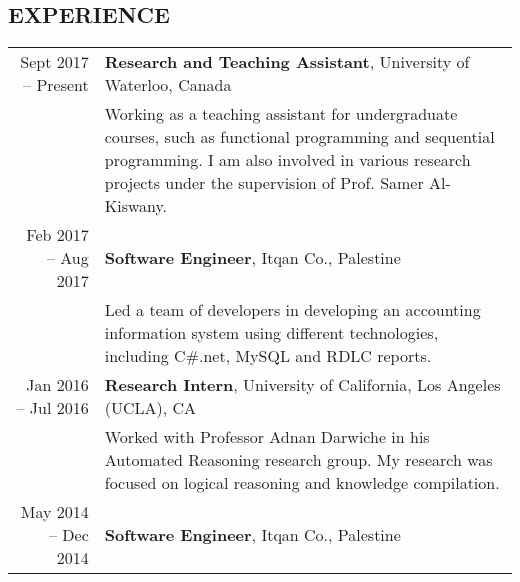    
  \subsection*{EXPERIENCE}
  
  \begin{tabularx}{\linewidth}{r X}
Sept 2017 -- Present & \textbf{Research and Teaching Assistant}, University of Waterloo, Canada\\
 & Working as a teaching assistant for undergraduate courses, such as functional programming and sequential programming. I am also involved in various research projects under the supervision of Prof. Samer Al-Kiswany. \\
    Feb 2017 -- Aug 2017 & \textbf{Software Engineer}, Itqan Co., Palestine\\
    & Led a team of developers in developing an accounting information system using different technologies, including C\#.net, MySQL and RDLC reports.\\ 
           Jan 2016 -- Jul 2016 & \textbf{Research Intern}, University of California, Los Angeles (UCLA), CA\\
    & 
      Worked with Professor Adnan Darwiche in his Automated Reasoning research group. My research was focused on logical reasoning and knowledge compilation.\\
    May 2014 -- Dec 2014 & \textbf{Software Engineer}, Itqan Co., Palestine
	\end{tabularx}